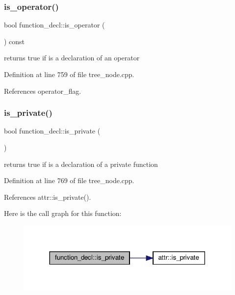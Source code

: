 \subsubsection{\texorpdfstring{is\+\_\+operator()}{is\_operator()}}
{\footnotesize\ttfamily bool function\+\_\+decl\+::is\+\_\+operator (\begin{DoxyParamCaption}{ }\end{DoxyParamCaption}) const}



returns true if is a declaration of an operator 



Definition at line 759 of file tree\+\_\+node.\+cpp.



References operator\+\_\+flag.

\mbox{\label{structfunction__decl_a3dce5abf8fe3368cbd61fb5d925e4379}} 
\subsubsection{\texorpdfstring{is\+\_\+private()}{is\_private()}}
{\footnotesize\ttfamily bool function\+\_\+decl\+::is\+\_\+private (\begin{DoxyParamCaption}{ }\end{DoxyParamCaption})}



returns true if is a declaration of a private function 



Definition at line 769 of file tree\+\_\+node.\+cpp.



References attr\+::is\+\_\+private().

Here is the call graph for this function\+:
\nopagebreak
\begin{figure}[H]
\begin{center}
\leavevmode
\includegraphics[width=317pt]{d0/d43/structfunction__decl_a3dce5abf8fe3368cbd61fb5d925e4379_cgraph}
\end{center}
\end{figure}
\mbox{\label{structfunction__decl_ad865eb7f91188526497ffe2857e3edb5}} 
